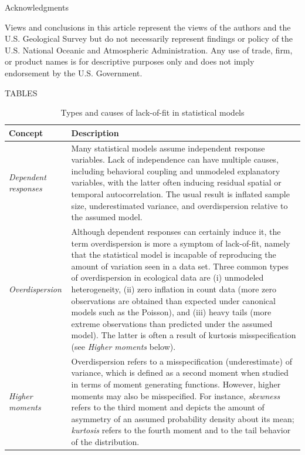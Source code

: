 \documentclass[12pt,english]{article}
\begin{document}
\begin{spacing}{1.9}
    \centerline{\sc Acknowledgments} Views and conclusions in this
    article represent the views of the authors and the U.S. Geological
    Survey but do not necessarily represent findings or policy of the
    U.S. National Oceanic and Atmospheric Administration.  Any use of
    trade, firm, or product names is for descriptive purposes only and
    does not imply endorsement by the U.S. Government.

    \renewcommand{\refname}{Literature Cited}
    



    \pagebreak




    TABLES

    \begin{table}[htp]
      \caption{Types and causes of lack-of-fit in statistical models}
      \label{tab:lof}
      \centering
      \begin{tabular}{p{3cm}p{13cm}}
        \hline
        Concept & Description \\
        \hline
        \textit{Dependent responses} & Many statistical models assume independent response variables.  Lack of independence can have multiple causes, including behavioral coupling and unmodeled explanatory variables, with the latter often inducing residual spatial or temporal autocorrelation.  The usual result is inflated sample size, underestimated variance, and overdispersion relative to the assumed model. \\
        \textit{Overdispersion} & Although dependent responses can certainly induce it, the term overdispersion is more a symptom of lack-of-fit, namely that the statistical model is incapable of reproducing the amount of variation seen in a data set.  Three common types of overdispersion in ecological data are (i) unmodeled heterogeneity, (ii) zero inflation in count data (more zero observations are obtained than expected under canonical models such as the Poisson), and (iii) heavy tails (more extreme observations than predicted under the assumed model). The latter is often a result of kurtosis misspecification (see \textit{Higher moments} below).\\
        \textit{Higher moments} & Overdispersion refers to a misspecification (underestimate) of variance, which is defined as a second moment when studied in terms of moment generating functions.  However, higher moments may also be misspecified. For instance, \textit{skewness} refers to the third moment and depicts the amount of asymmetry of an assumed probability density about its mean; \textit{kurtosis} refers to the fourth moment and to the tail behavior of the distribution.  \\

\end{tabular}
\end{table}
\end{spacing}
\end{document}
